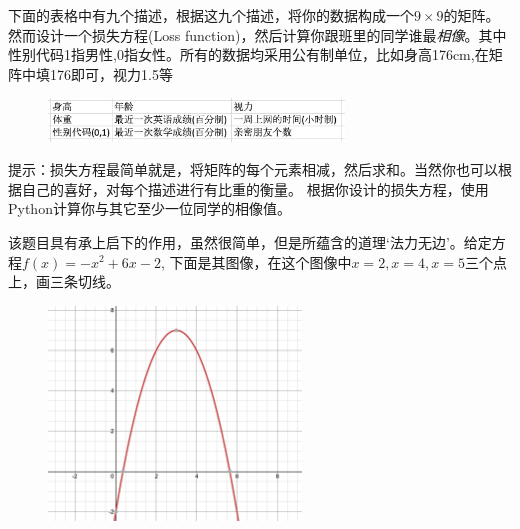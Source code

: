 \documentclass[12pt]{article}
\numberwithin{figure}{section}
\newenvironment{fullmodel}{
			\smallskip\noindent
			\begin{minipage}{\textwidth+\marginparwidth+\marginparsep}\smallskip\smallskip}
			{\smallskip\smallskip\end{minipage}\vspace{.1in}
			}
\numberwithin{equation}{section}
\newenvironment{question}[2][Question]{\begin{trivlist}
\item[\hskip \labelsep {\bfseries #1}\hskip \labelsep {\bfseries #2.}]}{\end{trivlist}}
\begin{document}
\begin{fullmodel}
\begin{question}{思考题C3-Q1}
\begin{figure}[H]
\begin{subfigure}[b]{0.45\textwidth}
		\end{subfigure}
	\end{figure}
\end{question}	
\end{fullmodel}


\begin{fullmodel}
\begin{question}{设计题 C3-Q2}
	下面的表格中有九个描述，根据这九个描述，将你的数据构成一个$9 \times 9$的矩阵。然而设计一个损失方程(Loss function)，然后计算你跟班里的同学谁最\textit{相像}。其中性别代码1指男性,0指女性。所有的数据均采用公有制单位，比如身高176cm,在矩阵中填176即可，视力1.5等
	\begin{figure}[H]
		\centering
		\includegraphics[width=0.7\textwidth]{fig/c3q2}
	\end{figure}
\end{question}
\noindent
提示：损失方程最简单就是，将矩阵的每个元素相减，然后求和。当然你也可以根据自己的喜好，对每个描述进行有比重的衡量。	根据你设计的损失方程，使用Python计算你与其它至少一位同学的相像值。
\end{fullmodel}


\begin{question}{作图题 C3-Q3}
	该题目具有承上启下的作用，虽然很简单，但是所蕴含的道理`法力无边'。给定方程$f(x) = -x^2+ 6x-2$, 下面是其图像，在这个图像中$x=2, x = 4, x =5$三个点上，画三条切线。
	\begin{figure}[H]
		\centering
		\includegraphics[width=0.6\textwidth]{fig/c3q3}
	\end{figure}
\end{question}
\end{document}
